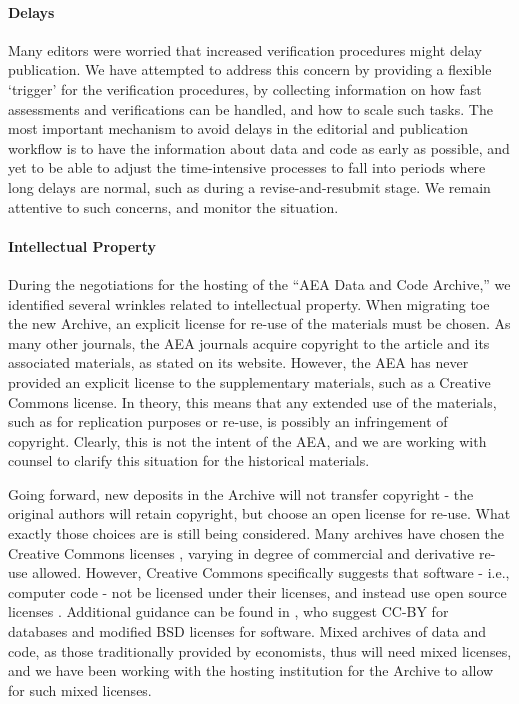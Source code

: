 \documentclass[PP]{AEA}
\begin{document}
\paragraph{Delays} Many editors were worried that increased verification procedures might delay publication. We have attempted to address this concern by providing a flexible `trigger' for the verification procedures, by collecting information on how fast assessments and verifications can be handled, and how to scale such tasks. The most important mechanism to avoid delays in the editorial and publication workflow is to have the information about data and code as early as possible, and yet to be able to adjust the time-intensive processes to fall into periods where long delays are normal, such as during a revise-and-resubmit stage. We remain attentive to such concerns, and monitor the situation.

\paragraph{Intellectual Property} During the negotiations for the hosting of the ``AEA Data and Code Archive,'' we identified several wrinkles related to intellectual property. When migrating toe the new Archive, an explicit license for re-use of the materials must be chosen. As many other journals, the AEA journals acquire copyright to the article and its associated materials, as stated on its website. However, the AEA has never provided an explicit license to the supplementary materials, such as a Creative Commons license. In theory, this means that any extended use of the materials, such as for replication purposes or re-use, is possibly an infringement of copyright. Clearly, this is not the intent of the AEA, and we are working with counsel to clarify this situation for the historical materials. 

Going forward, new deposits in the Archive will not transfer copyright - the original authors will retain copyright, but choose an open license for re-use. What exactly those choices are is still being considered. Many archives have chosen the Creative Commons licenses \cite{CreativeCommons2017}, varying in degree of commercial and derivative re-use allowed. However, Creative Commons specifically suggests that software - i.e., computer code - not be licensed under their licenses, and instead use open source licenses \cite{OpenSourceInitiative2018}. Additional guidance can be found in \cite{StoddenSoftwarePatentsBarrier2012}, who suggest CC-BY for databases and modified BSD licenses for software.  Mixed archives of data and code, as those traditionally provided by economists, thus will need mixed licenses, and we have been working with the hosting institution for the Archive to allow for such mixed licenses. 
\end{document}
